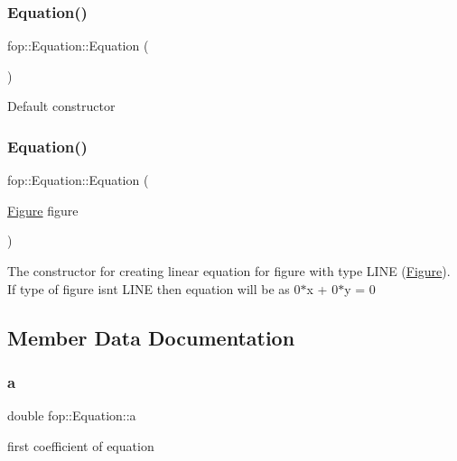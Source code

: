 \subsubsection{\texorpdfstring{Equation()}{Equation()}\hspace{0.1cm}{\footnotesize\ttfamily [1/2]}}
{\footnotesize\ttfamily fop\+::\+Equation\+::\+Equation (\begin{DoxyParamCaption}{ }\end{DoxyParamCaption})}

Default constructor \mbox{\label{structfop_1_1_equation_a93886a166390114aa62609af6ddd1d72}} 
\subsubsection{\texorpdfstring{Equation()}{Equation()}\hspace{0.1cm}{\footnotesize\ttfamily [2/2]}}
{\footnotesize\ttfamily fop\+::\+Equation\+::\+Equation (\begin{DoxyParamCaption}\item[{\mbox{\hyperlink{classfop_1_1_figure}{Figure}}}]{figure }\end{DoxyParamCaption})}

The constructor for creating linear equation for \textquotesingle{}figure\textquotesingle{} with type L\+I\+NE (\mbox{\hyperlink{classfop_1_1_figure}{Figure}}). If type of \textquotesingle{}figure\textquotesingle{} isn\textquotesingle{}t L\+I\+NE then equation will be as 0$\ast$x + 0$\ast$y = 0 

\subsection{Member Data Documentation}
\mbox{\label{structfop_1_1_equation_a9cc4610dcc3a68de1def70a8573cf75f}} 
\subsubsection{\texorpdfstring{a}{a}}
{\footnotesize\ttfamily double fop\+::\+Equation\+::a}

first coefficient of equation \mbox{\label{structfop_1_1_equation_a6bf704c5c87c9a321c18869f634a5ff1}} 
